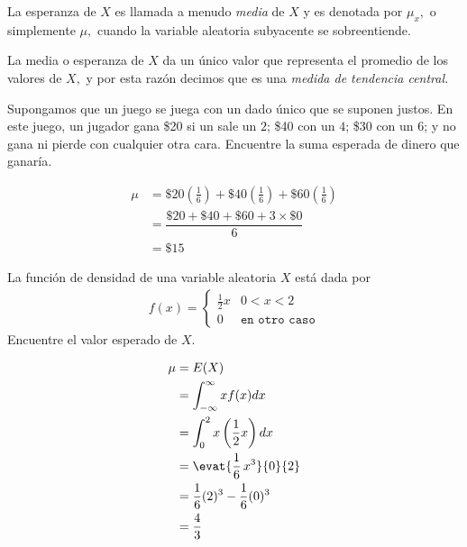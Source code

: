  La esperanza de $X$ es llamada a menudo \emph{media} de $X$ y es denotada por $\mu_{x},$ o simplemente $\mu,$ cuando la variable aleatoria subyacente se sobreentiende.


 La media o esperanza de $X$ da un único valor que representa el promedio de los valores de $X,$ y por esta razón decimos que es una \emph{medida de tendencia central.}



 \begin{ejemplo}
  \label{exmp:3.1}
  Supongamos que un juego se juega con un dado único que se suponen justos. En este juego, un jugador gana \$20 si un sale un $2$; \$40 con un $4$; \$30 con un $6$; y no gana ni pierde con cualquier otra cara. Encuentre la suma esperada de dinero que ganaría.
 \end{ejemplo}





 \begin{align}
 \mu &= \$ 20 \left( \frac{1}{6} \right) + \$40 \left( \frac{1}{6} \right) + \$60\left( \frac{1}{6} \right) \\
   &= \dfrac{\$20 + \$40 + \$60 + 3\times\$ 0}{6} \\
   &= \$ 15
\end{align}




 \begin{ejemplo}
  \label{exmp:3.2}
  La función de densidad de una variable aleatoria $X$ está dada por
  \begin{align}
   f(x)=
   \begin{cases}
    \frac{1}{2}x & 0<x<2 \\
    0 & \texttt{en otro caso}
   \end{cases}
  \end{align}
Encuentre el valor esperado de $X.$
 \end{ejemplo}



{}
\begin{align}
 \mu &= E(X)\\ & = \int_{-\infty}^{\infty} xf(x) dx \\
  &= \int_{0}^{2} x\left( \dfrac{1}{2}x \right) dx\\
  &= \evat{\frac{1}{6} \, x^{3}}{0}{2}\\
  &= \frac{1}{6}(2)^{3}-\frac{1}{6}(0)^{3} \\
  &= \frac{4}{3}
\end{align}



